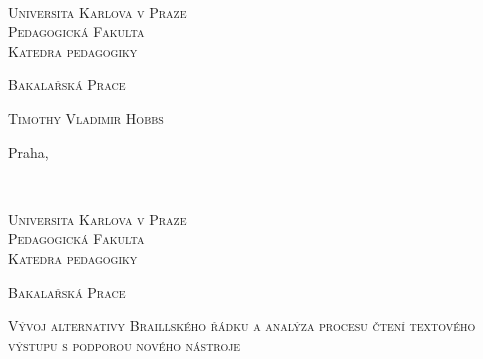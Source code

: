 \documentclass[a4paper,12pt,czech,cleardoublepage=empty]{scrreprt}
\newcommand{\SubjectCs}{Bakalařská Prace}
\newcommand{\TitleCs}{Vývoj alternativy Braillského řádku a analýza procesu čtení textového výstupu s podporou nového nástroje}
\newcommand{\AuthorName}{Timothy Vladimir Hobbs}
\newcommand{\IssuedIn}{Praha}
\newcommand{\DepartmentCs}{Katedra pedagogiky}
\newcommand{\noun}[1]{\textsc{#1}}
\begin{document}
~\thispagestyle{empty}\vfill{}

\begin{center}
\vspace{10mm}
\textsf{\textsc{\noun{\LARGE Universita Karlova v Praze}}}\\
\vspace{0.5em}
\textsf{\textsc{\noun{\LARGE Pedagogická Fakulta}}}\\
\vspace*{1em}
\textsf{\textsc{\noun{\Large \DepartmentCs}}}\vspace{15mm}
\vspace{30mm}

\textsf{\textsc{\noun{\huge \SubjectCs}}}{\huge \par}

\vspace{15mm}


\vspace{10mm}

\textsf{\textsc{\noun{\Large \AuthorName}}}

\end{center}

\vspace*{\fill}


\vspace{10mm}

\textsf{\large \IssuedIn, \the\year}


\clearpage{}~\thispagestyle{empty}\begin{center}\vspace{10mm}


\textsf{\textsc{\noun{\LARGE Universita Karlova v Praze}}}\\
\vspace{0.5em}
\textsf{\textsc{\noun{\LARGE Pedagogická Fakulta}}}\\
\vspace*{1em}
\textsf{\textsc{\noun{\Large \DepartmentCs}}}\vspace{15mm}


\vspace{15mm}

\textsf{\textsc{\noun{\huge \SubjectCs}}}{\huge \par}

\vspace{15mm}


\textsf{\textsc{\noun{\LARGE \TitleCs}}}{\LARGE \par}


\vspace{10mm}


\end{center} 
\end{document}
